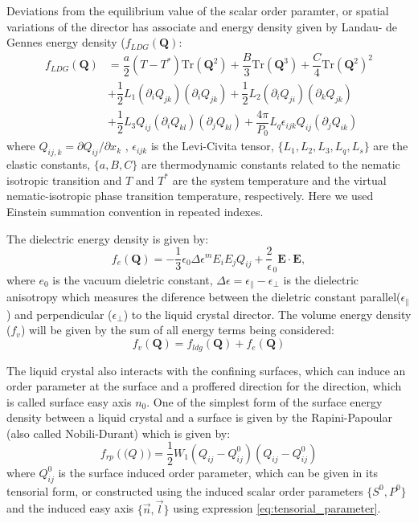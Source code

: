 \documentclass[final,5p,times,twocolumn]{elsarticle}
\begin{document}
Deviations from the equilibrium value of the scalar order paramter, or
spatial variations of the director has associate and energy density
given by Landau- de Gennes energy density ($f_{LDG}(\mathbf{Q})$:
\begin{align}\label{eq:Landau_deGennes} \nonumber
  f_{LDG}(\mathbf{Q})&=\dfrac{a}{2}(T-T^*) \text{Tr}(\mathbf{Q}^2) +
                       \dfrac{B}{3} \text{Tr}(\mathbf{Q}^3)
                       +  \dfrac{C}{4} \text{Tr}(\mathbf{Q}^2)^2 \\ \nonumber
                     &+ \dfrac{1}{2} L_1 \left( \partial_i Q_{jk} \right)
                       \left( \partial_i Q_{jk} \right) + \dfrac{1}{2} L_2
                       \left( \partial_i Q_{ji} \right) \left( \partial_k Q_{jk} \right) \\
                     &+\dfrac{1}{2} L_3 Q_{ij}\left( \partial_i Q_{kl}\right) \left(\partial_j Q_{kl}\right)  + \dfrac{4 \pi}{P_0} L_q \epsilon_{ijk} Q_{ij}\left( \partial_j Q_{ik} \right)                     
\end{align}
%
where $Q_{ij,k}= \partial Q_{ij}/\partial x_k$ , $\epsilon_{ijk}$ is
the Levi-Civita tensor, $\lbrace L_1 ,L_2,L_3, L_q, L_s \rbrace$ are
the elastic constants, $\lbrace a,B,C \rbrace$ are thermodynamic
constants related to the nematic isotropic transition and $T$ and
$T^*$ are the system temperature and the virtual nematic-isotropic
phase transition temperature, respectively. Here we used Einstein
summation convention in repeated indexes.

The dielectric energy density is given by:
\begin{equation}
 f_e(\mathbf{Q})= -\dfrac{1}{3} \epsilon_0 \Delta \epsilon^m E_i E_j Q_{ij}+ \dfrac{2} \epsilon_0 \mathbf{E} \cdot \mathbf{E},
\end{equation}
where $e_0$ is the vacuum dieletric constant,
$\Delta \epsilon=\epsilon_{\parallel} - \epsilon_{\perp}$ is the
dielectric anisotropy which measures the diference between the
dieletric constant parallel($\epsilon_{\parallel}$) and perpendicular
($\epsilon_{\perp}$) to the liquid crystal director.  The volume energy
density ($f_v$) will be given by the sum of all energy terms being considered:
\begin{equation}
  f_v(\mathbf{Q})=f_{ldg}(\mathbf{Q})+f_e(\mathbf{Q})
\end{equation}

The liquid crystal also interacts with the confining surfaces, which
can induce an order parameter at the surface and a proffered direction
for the direction, which is called surface easy axis $n_0$. One of the
simplest form of the surface energy density between a liquid crystal
and a surface is given by the Rapini-Papoular (also called Nobili-Durant) which is given by:
\begin{equation}
  f_{rp}(\mathbf(Q))=\dfrac{1}{2} W_1 (Q_{ij}-Q^0_{ij}) (Q_{ij}-Q^0_{ij})
\end{equation}
where $Q_{ij}^0$ is the surface induced order parameter, which can be
given in its tensorial form, or constructed using the induced scalar
order parameters $\lbrace S^0, P^0 \rbrace$ and the induced easy axis
$\lbrace \vec{n}, \vec{l} \rbrace$ using expression
\ref{eq:tensorial_parameter}.
\end{document}
